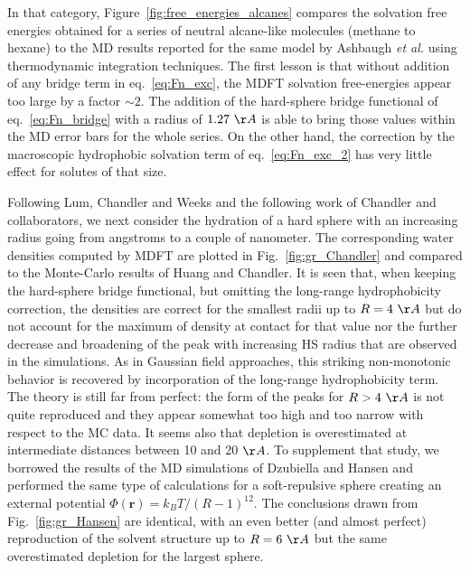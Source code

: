 \documentclass[aip,jcp,preprint]{revtex4-1}
\newcommand{\rr}{\mathbf{r}}
\begin{document}
In that category, Figure~\ref{fig:free_energies_alcanes} compares the solvation free energies obtained for a series of  neutral alcane-like  molecules (methane to hexane) to the MD results reported for the same model by  Ashbaugh {\em et al.} using thermodynamic integration techniques\cite{ashbaugh_hydration_1998}. The first lesson is that without addition of any bridge term in eq.~\ref{eq:Fn_exc}, the MDFT solvation free-energies appear too large by a factor $\sim 2$. The addition of the hard-sphere bridge functional of eq.~\ref{eq:Fn_bridge} with a radius of $1.27~\AA$ is able to bring those values within the MD  error bars for the whole series. On the other hand, the correction by the macroscopic hydrophobic solvation term of eq.~\ref{eq:Fn_exc_2} has very little effect for solutes of that size.

Following Lum, Chandler and Weeks\cite{lum99} and the following work of Chandler and collaborators\cite{tenwolde01,huang02,varilly11},  we next consider the hydration of a hard sphere with an increasing radius going from   angstroms to   a couple of nanometer.  The corresponding water densities computed by MDFT are plotted in Fig.~\ref{fig:gr_Chandler} and compared to the Monte-Carlo results of Huang and Chandler\cite{huang02}. It is seen that, when keeping the hard-sphere bridge functional, but omitting the long-range hydrophobicity correction, the densities are correct for the smallest radii up to $R=4~\AA$ but do not account for the maximum of density at contact for that value nor the further  decrease and broadening of the peak with increasing HS  radius that are   observed  in the simulations. As in Gaussian field approaches, this striking  non-monotonic behavior is recovered by incorporation of the long-range hydrophobicity term. The theory is still far from perfect:  the form of the peaks for $R>4~\AA$ is not quite reproduced and they appear somewhat too high and too narrow with respect to the MC data. It seems also that depletion is overestimated at intermediate distances between 10 and 20 $\AA$. To supplement that study, we borrowed the results of the MD simulations of Dzubiella and Hansen\cite{dzubiella04} and performed the same type of calculations  for a soft-repulsive sphere creating an external potential   $\Phi(\rr) = k_BT/(R -1)^{12}$. 
The conclusions drawn from Fig.~\ref{fig:gr_Hansen} are identical, with  an even better (and almost perfect) reproduction of the solvent structure up to $R=6~\AA$ but the same overestimated depletion for the largest sphere. 
\end{document}
